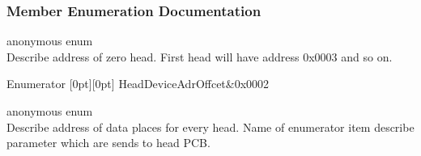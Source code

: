 \subsubsection{Member Enumeration Documentation}
\mbox{\label{classHeadSetting_a26c38b767aa2b7ab7291ef630eec5cae}} 
{\footnotesize\ttfamily \texorpdfstring{anonymous enum}{anonymous enum}}\\
Describe address of zero head. First head will have address 0x0003 and so on.
\begin{DoxyEnumFields}{Enumerator}
[0pt][0pt]{}\mbox{\label{classHeadSetting_a26c38b767aa2b7ab7291ef630eec5caeab0f78d4b529a6847e567515aca117a0c}} 
Head\+Device\+Adr\+Offcet&0x0002\\
\hline

\end{DoxyEnumFields}
\mbox{\label{classHeadSetting_a937c9f57091b4015548d4d6cac973a32}} 
{\footnotesize\ttfamily \texorpdfstring{anonymous enum}{anonymous enum}}\\
Describe address of data places for every head. Name of enumerator item describe parameter which are sends to head PCB. 
